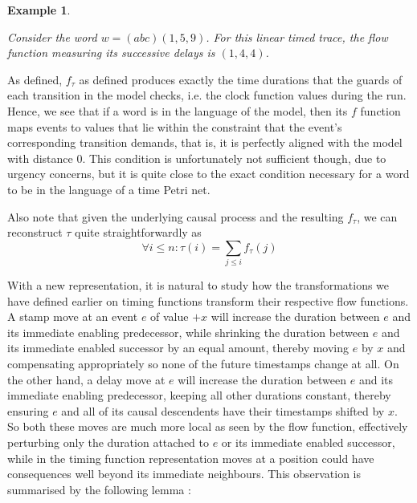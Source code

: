 \documentclass[conference]{IEEEtran}
\newcommand\eye{\ensurestackMath{\stackinset{c}{}{c}{-.33pt}%
		{\bullet}{\bigcirc}}}
\newtheorem{example}{Example}
\begin{document}
	\begin{example}\label{wordandflow}
		
%		
%		
		Consider the word $w = (abc)(1, 5, 9)$. For this linear timed trace, the flow function measuring its successive delays is $(1, 4, 4)$. 
	\end{example}
	
	As defined, $f_\tau$ as defined produces exactly the time durations that the guards of each transition in the model checks, i.e. the clock function values during the run.
	Hence, we see that if a word is in the language of the model, then its $f$ function maps events to values that lie within the constraint that the event's corresponding transition demands, that is, it is perfectly aligned with the model with distance 0. 
	This condition is unfortunately not sufficient though, due to urgency concerns, but it is quite close to the exact condition necessary for a word to be in the language of a time Petri net. 
	
	Also note that given the underlying causal process and the resulting $f_\tau$, we can reconstruct $\tau$ quite straightforwardly as $$\forall i \leq n : \tau(i) = \sum_{j \leq i} f_\tau(j)$$
	
	With a new representation, it is natural to study how the transformations we have defined earlier on timing functions transform their respective flow functions. A stamp move at an event $e$ of value $+x$ will increase the duration between $e$ and its immediate enabling predecessor, while shrinking the duration between $e$ and its immediate enabled successor by an equal amount, thereby moving $e$ by $x$ and compensating appropriately so none of the future timestamps change at all. 
	On the other hand, a delay move at $e$ will increase the duration between $e$ and its immediate enabling predecessor, keeping all other durations constant, thereby ensuring $e$ and all of its causal descendents have their timestamps shifted by $x$. 
	So both these moves are much more local as seen by the flow function, effectively perturbing only the duration attached to $e$ or its immediate enabled successor, while in the timing function representation moves at a position could have consequences well beyond its immediate neighbours. 
	This observation is summarised by the following lemma : 
	
\end{document}
